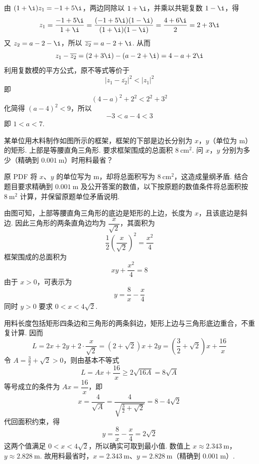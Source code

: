 \begin{solution}
由 \((1+\i)z_1=-1+5\i\)，两边同除以 \(1+\i\)，并乘以共轭复数 \(1-\i\)，得
\[
z_1=\frac{-1+5\i}{1+\i}
=\frac{(-1+5\i)(1-\i)}{(1+\i)(1-\i)}
=\frac{4+6\i}{2}=2+3\i
\]
又 \(z_2=a-2-\i\)，所以 \(\overline{z_2}=a-2+\i\). 从而
\[
z_1-\overline{z_2}
=(2+3\i)-(a-2+\i)=4-a+2\i
\]
利用复数模的平方公式，原不等式等价于
\[
\left|z_1-\overline{z_2}\right|^2<|z_1|^2
\]
即
\[
(4-a)^2+2^2<2^2+3^2
\]
化简得 \((a-4)^2<9\)，所以
\[
-3<a-4<3
\]
即 \(1<a<7\).
\end{solution}

\begin{problem}
某单位用木料制作如图所示的框架，框架的下部是边长分别为 \(x\)，\(y\)（单位为 \(\mathrm{m}\)）的矩形. 上部是等腰直角三角形. 要求框架围成的总面积 \(8 \mathrm{~cm}^{2}\). 问 \(x\)，\(y\) 分别为多少（精确到 \(0.001 \mathrm{~m}\)）时用料最省？

\end{problem}

\begin{solution}
原 PDF 将 \(x\)、\(y\) 的单位写为 \(\mathrm{m}\)，却将总面积写为 \(8\mathrm{~cm}^{2}\)，这造成量纲矛盾. 结合题目要求精确到 \(0.001\mathrm{~m}\) 及公开答案的数值，以下按原题的数值条件将总面积按 \(8\mathrm{~m}^{2}\) 计算，并保留原题单位矛盾说明.

由图可知，上部等腰直角三角形的底边是矩形的上边，长度为 \(x\)，且该底边是斜边. 因此三角形的两条直角边均为 \(\dfrac{x}{\sqrt2}\)，其面积为
\[
\frac12\left(\frac{x}{\sqrt2}\right)^2=\frac{x^2}{4}
\]
框架围成的总面积为
\[
xy+\frac{x^2}{4}=8
\]
由于 \(x>0\)，可表示为
\[
y=\frac8x-\frac{x}{4}
\]
同时 \(y>0\) 要求 \(0<x<4\sqrt2\).

用料长度包括矩形四条边和三角形的两条斜边，矩形上边与三角形底边重合，不重复计算. 因而
\[
L=2x+2y+2\cdot\frac{x}{\sqrt2}
=(2+\sqrt2)x+2y
=\left(\frac32+\sqrt2\right)x+\frac{16}{x}
\]
令 \(A=\frac32+\sqrt2>0\)，则由基本不等式
\[
L=Ax+\frac{16}{x}\geqslant2\sqrt{16A}=8\sqrt A
\]
等号成立的条件为 \(Ax=\dfrac{16}{x}\)，即
\[
x=\frac4{\sqrt A}
=\frac4{\sqrt{\frac32+\sqrt2}}
=8-4\sqrt2
\]
代回面积约束，得
\[
y=\frac8x-\frac{x}{4}=2\sqrt2
\]
这两个值满足 \(0<x<4\sqrt2\)，所以确实可取到最小值. 数值上
\(x\approx2.343\mathrm{~m}\)，\(y\approx2.828\mathrm{~m}\).
故用料最省时，\(x=2.343\mathrm{~m}\)、\(y=2.828\mathrm{~m}\)（精确到 \(0.001\mathrm{~m}\)）.
\end{solution}

